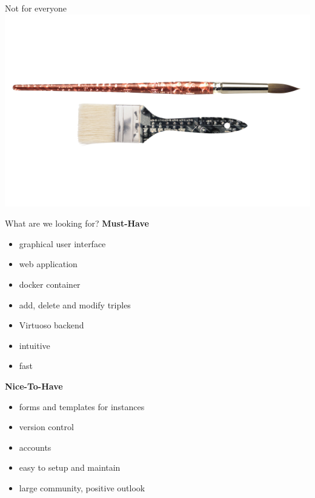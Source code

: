 \documentclass[aspectratio=1610]{beamer}
\begin{document}
\begin{frame}{Not for everyone}
\centering
\includegraphics[width=0.9\paperwidth]{img/complicated.png}
\end{frame}

\begin{frame}{What are we looking for?}
\centering
\textbf{Must-Have}
\begin{itemize}
\item graphical user interface
\item web application
\item docker container 
\item add, delete and modify triples 
\item Virtuoso backend
\item intuitive 
\item fast
\end{itemize}
\textbf{Nice-To-Have}
\begin{itemize}
\item forms and templates for instances 
\item version control
\item accounts
\item easy to setup and maintain
\item large community, positive outlook
\end{itemize}
\end{frame}
\end{document}
